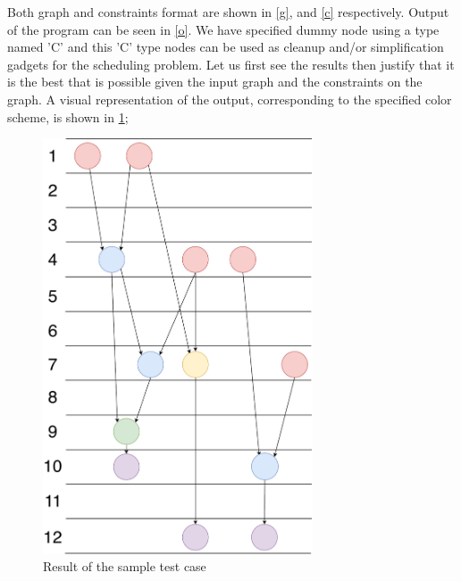\documentclass[letterpaper, 10 pt, conference]{ieeeconf}  %
\begin{document}
Both graph and constraints format are shown in \ref{g}, and \ref{c} respectively. Output of the program can be seen in \ref{o}. We have specified dummy node using a type named 'C' and this 'C' type nodes can be used as cleanup and/or simplification gadgets for the scheduling problem. Let us first see the results then justify that it is the best that is possible given the input graph and the constraints on the graph. A visual representation of the output, corresponding to the specified color scheme, is shown in \ref{fig:sched};

\begin{figure}[!h]
  \centering
  \includegraphics[width=80mm]{schedule.pdf}
  \caption{Result of the sample test case}
  \label{fig:sched}
\end{figure}
\end{document}

